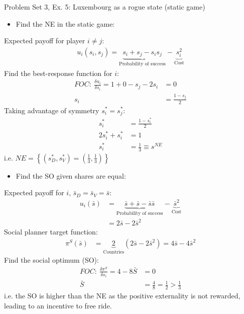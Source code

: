 \begin{frame}{Problem Set 3, Ex. 5: Luxembourg as a rogue state (static game)}
  \begin{multicols}{2}
    \begin{itemize}
      \item[(a)] Find the NE in the static game:
    \end{itemize}
    Expected payoff for player $i\neq j$:
    \begin{align*}
      u_i(s_i,s_j)=\underbrace{s_i+s_j-s_is_j}_\text{Probability of success}-\underbrace{s_i^2}_\text{Cost}
    \end{align*}
    Find the best-response function for $i$:
    \begin{align*}
      FOC:\ \frac{\delta u_i}{\delta s_i}=1+0-s_j-2s_i&=0\\
       s_i&=\frac{1-s_j}{2}
    \end{align*}
    Taking advantage of symmetry $s_i^{*}=s_j^{*}$:
    \begin{align*}
       s_i^{*}&=\frac{1-s_i^{*}}{2}\\
      2s_i^{*}+s_i^{*}&=1\\
       s_i^{*}&=\frac{1}{3}\equiv s^{NE}
    \end{align*}
    i.e. $NE=\left\{(s_D^{*},s_V^{*})=(\frac{1}{3},\frac{1}{3})\right\}$
  \vfill\null\columnbreak
    \begin{itemize}
      \item[(b)] Find the SO given shares are equal:
    \end{itemize}
    Expected payoff for $i$, $\bar{s}_D=\bar{s}_V=\bar{s}$:
    \begin{align*}
      u_i(\bar{s})&=\underbrace{\bar{s}+\bar{s}-\bar{s}\bar{s}}_\text{Probability of success}-\underbrace{\bar{s}^2}_\text{Cost}\\
                  &=2\bar{s}-2\bar{s}^2
    \end{align*}
    Social planner target function:
    \begin{align*}
      \pi^S(\bar{s})&=\underbrace{2}_\text{Countries}(2\bar{s}-2\bar{s}^2)=4\bar{s}-4\bar{s}^2
    \end{align*}
    Find the social optimum (SO):
    \begin{align*}
      FOC:\ \frac{\delta\pi^S}{\delta s_i}=4-8\bar{S}&=0\\
       \bar{S}&=\frac{4}{8}=\frac{1}{2}>\frac{1}{3}
    \end{align*}
    i.e. the SO is higher than the NE as the positive externality is not rewarded, leading to an incentive to free ride.
  \vfill\null
  \end{multicols}
\end{frame}


